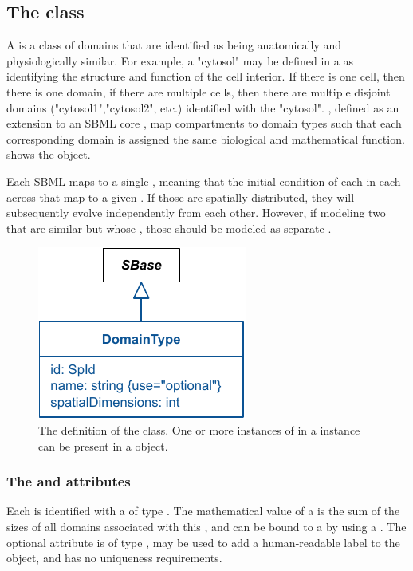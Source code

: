 \subsection{The  class}
\label{domaintype-class}
A \DomainType is a class of domains that are identified as being anatomically and physiologically similar.  For example, a \DomainType "cytosol" may be defined in a \Geometry as identifying the structure and function of the cell interior.  If there is one cell, then there is one domain, if there are multiple cells, then there are multiple disjoint domains ("cytosol1","cytosol2", etc.) identified with the \DomainType "cytosol".  \CompartmentMappings, defined as an extension to an SBML core \Compartment, map compartments to domain types such that each corresponding domain is assigned the same biological and mathematical function.  shows the \DomainType object.

Each SBML \Compartment maps to a single \DomainType, meaning that the initial condition of each \Species in each \Compartment {} across \Domains that map to a given \DomainType. If those \Species are spatially distributed, they will subsequently evolve independently from each other. However, if modeling two \Domains that are similar but whose \Species {}, those \Domains should be modeled as separate \DomainTypes.

\begin{figure}[ht]
  \includegraphics{figs/DomainType-uml}
  \caption{The definition of the \DomainType class. One or more instances of \DomainType in a \ListOfDomainTypes instance can be present in a \Geometry object.}
  \label{DomainType-uml}
\end{figure}

\subsubsection{The \fixttspace{} and \fixttspace{} attributes}
Each \DomainType is identified with a  of type .  The mathematical value of a \CompartmentMapping is the sum of the sizes of all domains associated with this \DomainType, and can be bound to a \Parameter by using a \SpatialSymbolReference {}.  The optional  attribute is of type , may be used to add a human-readable label to the object, and has no uniqueness requirements.


